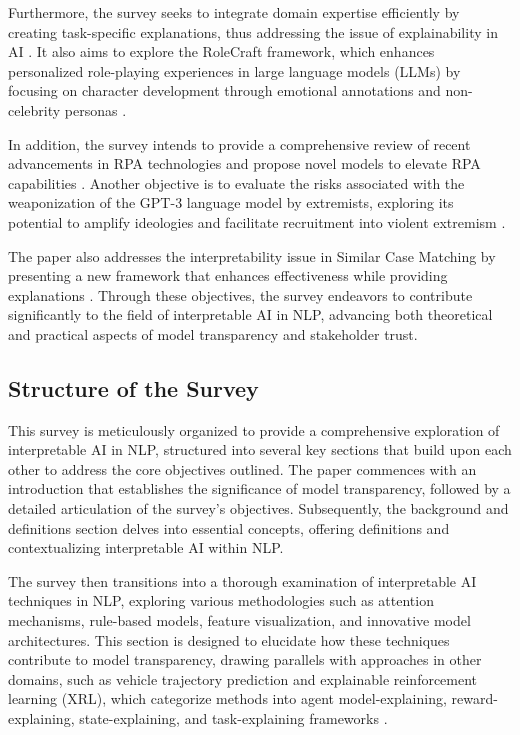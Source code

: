 Furthermore, the survey seeks to integrate domain expertise efficiently by creating task-specific explanations, thus addressing the issue of explainability in AI \cite{chiaburu2024copronnconceptbasedprototypicalnearest}. It also aims to explore the RoleCraft framework, which enhances personalized role-playing experiences in large language models (LLMs) by focusing on character development through emotional annotations and non-celebrity personas \cite{tao2024rolecraftglmadvancingpersonalizedroleplaying}.



In addition, the survey intends to provide a comprehensive review of recent advancements in RPA technologies and propose novel models to elevate RPA capabilities \cite{pandy2024advancementsroboticsprocessautomation}. Another objective is to evaluate the risks associated with the weaponization of the GPT-3 language model by extremists, exploring its potential to amplify ideologies and facilitate recruitment into violent extremism \cite{mcguffie2020radicalizationrisksgpt3advanced}.



The paper also addresses the interpretability issue in Similar Case Matching by presenting a new framework that enhances effectiveness while providing explanations \cite{lin2023interpretabilityframeworksimilarcase}. Through these objectives, the survey endeavors to contribute significantly to the field of interpretable AI in NLP, advancing both theoretical and practical aspects of model transparency and stakeholder trust.



\subsection{Structure of the Survey} \label{subsec:Structure of the Survey}



This survey is meticulously organized to provide a comprehensive exploration of interpretable AI in NLP, structured into several key sections that build upon each other to address the core objectives outlined. The paper commences with an introduction that establishes the significance of model transparency, followed by a detailed articulation of the survey's objectives. Subsequently, the background and definitions section delves into essential concepts, offering definitions and contextualizing interpretable AI within NLP.



The survey then transitions into a thorough examination of interpretable AI techniques in NLP, exploring various methodologies such as attention mechanisms, rule-based models, feature visualization, and innovative model architectures. This section is designed to elucidate how these techniques contribute to model transparency, drawing parallels with approaches in other domains, such as vehicle trajectory prediction and explainable reinforcement learning (XRL), which categorize methods into agent model-explaining, reward-explaining, state-explaining, and task-explaining frameworks .



